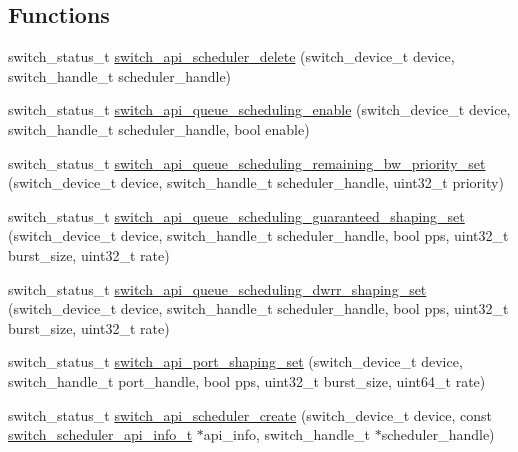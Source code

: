 \subsection*{Functions}
\begin{DoxyCompactItemize}
\item 
switch\+\_\+status\+\_\+t \hyperlink{group__Scheduler_gae39139c66f0da8f3edf32c055dd36cd2}{switch\+\_\+api\+\_\+scheduler\+\_\+delete} (switch\+\_\+device\+\_\+t device, switch\+\_\+handle\+\_\+t scheduler\+\_\+handle)
\item 
switch\+\_\+status\+\_\+t \hyperlink{group__Scheduler_ga88638019ba276b4af4006a1b7cc6ea38}{switch\+\_\+api\+\_\+queue\+\_\+scheduling\+\_\+enable} (switch\+\_\+device\+\_\+t device, switch\+\_\+handle\+\_\+t scheduler\+\_\+handle, bool enable)
\item 
switch\+\_\+status\+\_\+t \hyperlink{group__Scheduler_ga0049e941c1953496607a0867d1043638}{switch\+\_\+api\+\_\+queue\+\_\+scheduling\+\_\+remaining\+\_\+bw\+\_\+priority\+\_\+set} (switch\+\_\+device\+\_\+t device, switch\+\_\+handle\+\_\+t scheduler\+\_\+handle, uint32\+\_\+t priority)
\item 
switch\+\_\+status\+\_\+t \hyperlink{group__Scheduler_ga2bbd41f08991a4b3b295116986f13326}{switch\+\_\+api\+\_\+queue\+\_\+scheduling\+\_\+guaranteed\+\_\+shaping\+\_\+set} (switch\+\_\+device\+\_\+t device, switch\+\_\+handle\+\_\+t scheduler\+\_\+handle, bool pps, uint32\+\_\+t burst\+\_\+size, uint32\+\_\+t rate)
\item 
switch\+\_\+status\+\_\+t \hyperlink{group__Scheduler_gae5de5e440ded04b84d3f917948098b63}{switch\+\_\+api\+\_\+queue\+\_\+scheduling\+\_\+dwrr\+\_\+shaping\+\_\+set} (switch\+\_\+device\+\_\+t device, switch\+\_\+handle\+\_\+t scheduler\+\_\+handle, bool pps, uint32\+\_\+t burst\+\_\+size, uint32\+\_\+t rate)
\item 
switch\+\_\+status\+\_\+t \hyperlink{group__Scheduler_ga110f3ec7005eb59728f8f76a1db7b4c3}{switch\+\_\+api\+\_\+port\+\_\+shaping\+\_\+set} (switch\+\_\+device\+\_\+t device, switch\+\_\+handle\+\_\+t port\+\_\+handle, bool pps, uint32\+\_\+t burst\+\_\+size, uint64\+\_\+t rate)
\item 
switch\+\_\+status\+\_\+t \hyperlink{group__Scheduler_ga0aa139ae439a92753531b2893bd42521}{switch\+\_\+api\+\_\+scheduler\+\_\+create} (switch\+\_\+device\+\_\+t device, const \hyperlink{group__Scheduler_ga3e981ad1a349d10503bfbba6cd3b2f0d}{switch\+\_\+scheduler\+\_\+api\+\_\+info\+\_\+t} $\ast$api\+\_\+info, switch\+\_\+handle\+\_\+t $\ast$scheduler\+\_\+handle)

\end{DoxyCompactItemize}
